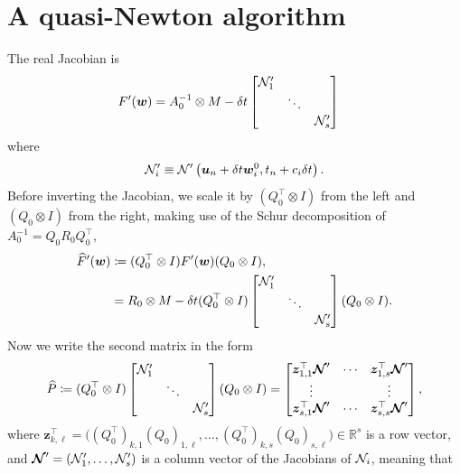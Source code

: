 \documentclass[review]{siamart}
\begin{document}
\section{A quasi-Newton algorithm}
The real Jacobian is
\begin{align}
F'(\bm{w}) &= A_0^{-1} \otimes M - 
\delta t
\begin{bmatrix} {\cal N}'_1 \\ 
& \ddots \\ 
& & {\cal N}'_s
\end{bmatrix}
\end{align}
where
\begin{align}
{\cal N}'_i \equiv {\cal N}' \left(\bm{u}_n + \delta t \bm{w}_i^0, t_n + c_i \delta t \right).
\end{align}
Before inverting the Jacobian, we scale it by $(Q_0^\top \otimes  I)$ from the left and $(Q_0 \otimes  I)$ from the right, making use of the Schur decomposition of $A^{-1}_0 = Q_0  R_0 Q^{\top}_0$,
\begin{align}
\widehat{F}'(\bm{w}) 
&\coloneqq (Q_0^\top \otimes  I) F'(\bm{w}) (Q_0 \otimes  I), \\
&= R_0 \otimes M - \delta t (Q_0^\top \otimes  I) \begin{bmatrix} {\cal N}'_1 \\ 
& \ddots \\ 
& & {\cal N}'_s
\end{bmatrix} (Q_0 \otimes I).
\end{align}
Now we write the second matrix in the form 
\begin{align}
\widehat{P} \coloneqq (Q_0^\top \otimes  I) \begin{bmatrix} {\cal N}'_1 \\ 
& \ddots \\ 
& & {\cal N}'_s
\end{bmatrix} (Q_0 \otimes I) 
=
\begin{bmatrix}
\bm{z}^\top_{1,1} \bm{{\cal N}}' & \cdots & \bm{z}^\top_{1,s} \bm{{\cal N}}' \\
\vdots & & \vdots \\
\bm{z}^\top_{s,1} \bm{{\cal N}}' & \cdots & \bm{z}^\top_{s,s} \bm{{\cal N}}'
\end{bmatrix},
\end{align}
where $\bm{z}^\top_{k,\ell} = \Big((Q_0^\top)_{k ,1} (Q_0)_{1, \ell}, \ldots, (Q_0^\top)_{k, s} (Q_0)_{s, \ell} \Big) \in \mathbb{R}^s$ is a row vector, and $\bm{{\cal N}}' = ({\cal N}'_1, \ldots, {\cal N}'_s)$ is a column vector of the Jacobians of ${\cal N}_i$, meaning that
\end{document}
